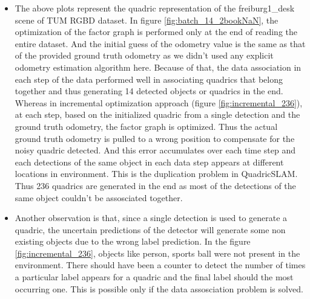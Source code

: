 \documentclass{article}
\begin{document}
\begin{itemize}
\item The above plots represent the quadric representation of the freiburg1\_desk scene of TUM RGBD dataset. In figure \ref{fig:batch_14_2bookNaN}, the optimization of the factor graph is performed only at the end of reading the entire dataset. And the initial guess of the odometry value is the same as that of the provided ground truth odometry as we didn't used any explicit odometry estimation algorithm here. Because of that, the data association in each step of the data performed well in associating quadrics that belong together and thus generating 14 detected objects or quadrics in the end. Whereas in incremental optimization approach (figure \ref{fig:incremental_236}), at each step, based on the initialized quadric from a single detection and the ground truth odometry, the factor graph is optimized. Thus the actual ground truth odometry is pulled to a wrong position to compensate for the noisy quadric detected. And this error accumulates over each time step and each detections of the same object in each data step appears at different locations in environment. This is the duplication problem in QuadricSLAM. Thus 236 quadrics are generated in the end as most of the detections of the same object couldn't be assosciated together.
\item Another observation is that, since a single detection is used to generate a quadric, the uncertain predictions of the detector will generate some non existing objects due to the wrong label prediction. In the figure \ref{fig:incremental_236}, objects like person, sports ball were not present in the environment. There should have been a counter to detect the number of times a particular label appears for a quadric and the final label should the most occurring one. This is possible only if the data assosciation problem is solved.




\end{itemize}
\end{document}
